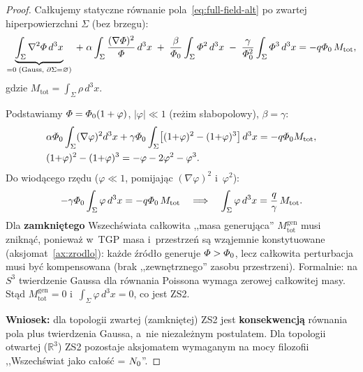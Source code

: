 \begin{proof}
Ca\l{}kujemy statyczne r\'ownanie pola~\eqref{eq:full-field-alt}
po zwartej hiperpowierzchni $\Sigma$ (bez brzegu):
\begin{equation}\label{eq:ZS2-integral}
  \underbrace{\int_\Sigma \nabla^2\varPhi\,d^3x}_{= 0\;\text{(Gauss, }\partial\Sigma = \varnothing\text{)}}
  \;+\; \alpha\int_\Sigma \frac{(\nabla\varPhi)^2}{\varPhi}\,d^3x
  \;+\; \frac{\beta}{\varPhi_0}\int_\Sigma \varPhi^2\,d^3x
  \;-\; \frac{\gamma}{\varPhi_0^2}\int_\Sigma \varPhi^3\,d^3x
  = -q\varPhi_0\,M_{\mathrm{tot}},
\end{equation}
gdzie $M_{\mathrm{tot}} = \int_\Sigma \rho\,d^3x$.

Podstawiamy $\varPhi = \varPhi_0(1 + \varphi)$,
$|\varphi| \ll 1$ (re\.zim s\l{}abopolowy), $\beta = \gamma$:
\begin{align*}
  &\alpha\varPhi_0\int_\Sigma (\nabla\varphi)^2 d^3x
  + \gamma\varPhi_0 \int_\Sigma
  \bigl[(1{+}\varphi)^2 - (1{+}\varphi)^3\bigr]\,d^3x
  = -q\varPhi_0 M_{\mathrm{tot}},\\
  &(1{+}\varphi)^2 - (1{+}\varphi)^3
  = -\varphi - 2\varphi^2 - \varphi^3.
\end{align*}
Do wiod\k{a}cego rz\k{e}du ($\varphi \ll 1$,
pomijaj\k{a}c $(\nabla\varphi)^2$ i~$\varphi^2$):
\begin{equation}\label{eq:ZS2-leading}
  -\gamma\varPhi_0 \int_\Sigma \varphi\,d^3x
  = -q\varPhi_0\,M_{\mathrm{tot}}
  \quad\Longrightarrow\quad
  \int_\Sigma \varphi\,d^3x
  = \frac{q}{\gamma}\,M_{\mathrm{tot}}.
\end{equation}
Dla \textbf{zamkni\k{e}tego} Wszech\'swiata
ca\l{}kowita ,,masa generuj\k{a}ca''
$M_{\mathrm{tot}}^{\mathrm{gen}}$ musi znikn\k{a}\'c,
poniewa\.z w~TGP masa i~przestrze\'n
s\k{a} wz\k{a}jemnie konstytuowane
(aksjomat~\ref{ax:zrodlo}):
ka\.zde \'zr\'od\l{}o generuje $\varPhi > \varPhi_0$,
lecz ca\l{}kowita perturbacja musi by\'c kompensowana
(brak ,,zewn\k{e}trznego'' zasobu przestrzeni).
Formalnie: na $S^3$ twierdzenie Gaussa
dla r\'ownania Poissona wymaga zerowej ca\l{}kowitej masy.
St\k{a}d $M_{\mathrm{tot}}^{\mathrm{gen}} = 0$
i~$\int_\Sigma \varphi\,d^3x = 0$, co jest ZS2.

\medskip\noindent
\textbf{Wniosek:} dla topologii zwartej (zamkni\k{e}tej)
ZS2 jest \textbf{konsekwencj\k{a}} r\'ownania pola plus
twierdzenia Gaussa, a~nie niezale\.znym postulatem.
Dla topologii otwartej ($\mathbb{R}^3$) ZS2 pozostaje
aksjomatem wymaganym na mocy filozofii
,,Wszech\'swiat jako ca\l{}o\'s\'c = $N_0$''.
\end{proof}

